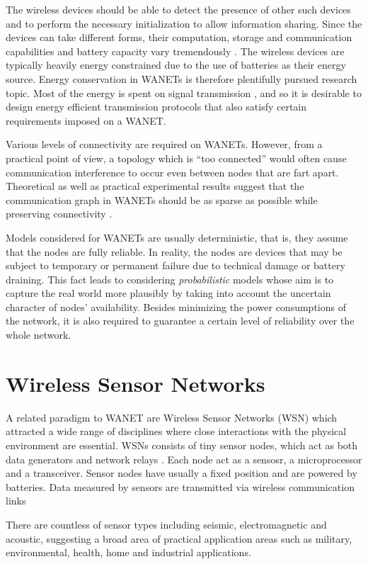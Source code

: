 The wireless devices should be able to detect the presence of other such devices and to perform the necessary initialization to allow information sharing.
Since the devices can take different forms, their computation, storage and communication capabilities and battery capacity vary tremendously \cite{toh01}.
The wireless devices are typically heavily energy constrained due to the use of batteries as their energy source.
Energy conservation in WANETs is therefore plentifully pursued research topic.
Most of the energy is spent on signal transmission \cite{halgamuge09}, 
and so it is desirable to design energy efficient transmission protocols that also satisfy certain requirements imposed on a WANET.

Various levels of connectivity are required on WANETs.
However, from a practical point of view, a topology which is ``too connected'' would often cause communication interference to occur even between nodes that are fart apart.
Theoretical as well as practical experimental results suggest that the communication graph in WANETs should be as sparse as possible while preserving connectivity \cite{blough02}.

Models considered for WANETs are usually deterministic, that is, they assume that the nodes are fully reliable. 
In reality, the nodes are devices that may be subject to temporary or permanent failure due to technical damage or battery draining.
This fact leads to considering \emph{probabilistic} models whose aim is to capture the real world more plausibly by taking into account the uncertain character of nodes' availability.
Besides minimizing the power consumptions of the network, it is also required to guarantee a certain level of reliability over the whole network.

\section{Wireless Sensor Networks}

A related paradigm to WANET are Wireless Sensor Networks (WSN) which attracted a wide range of disciplines where close interactions with the physical environment are essential.
WSNs consists of tiny sensor nodes, which act as both data generators and network relays \cite{akyildiz10}.
Each node act as a sensosr, a microprocessor and a transceiver.
Sensor nodes have usually a fixed position and are powered by batteries.
Data measured  by sensors are transmitted via wireless communication links

There are countless of sensor types including seismic, electromagnetic and acoustic, suggesting a broad area of practical application areas such as 
military, environmental, health, home and industrial applications.

